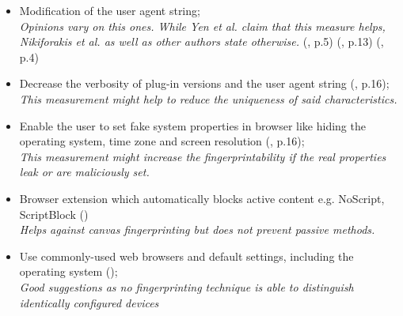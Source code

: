 \begin{itemize}
	\item Modification of the user agent string;\\
	\textit{Opinions vary on this ones. While Yen et al. claim that this measure helps, Nikiforakis et al. as well as other authors state otherwise.} (\textcite{yen09}, p.5) (\textcite{nikiforakis13}, p.13) (\textcite{eckersley10}, p.4)
	
	\item Decrease the verbosity of plug-in versions and the user agent string (\textcite{boda11}, p.16);\\
	\textit{This measurement might help to reduce the uniqueness of said characteristics.}
	
	\item Enable the user to set fake system properties in browser like hiding the operating system, time zone and screen resolution (\textcite{boda11}, p.16);\\
	\textit{This measurement might increase the fingerprintability if the real properties leak or are maliciously set.}
	
	\item Browser extension which automatically blocks active content e.g. NoScript, ScriptBlock (\textcite{web17}) \\
	\textit{Helps against canvas fingerprinting but does not prevent passive methods.}
	
	\item Use commonly-used web browsers and default settings, including the operating system (\textcite{web17});\\
	\textit{Good suggestions as no fingerprinting technique is able to distinguish identically configured devices}	
\end{itemize}

